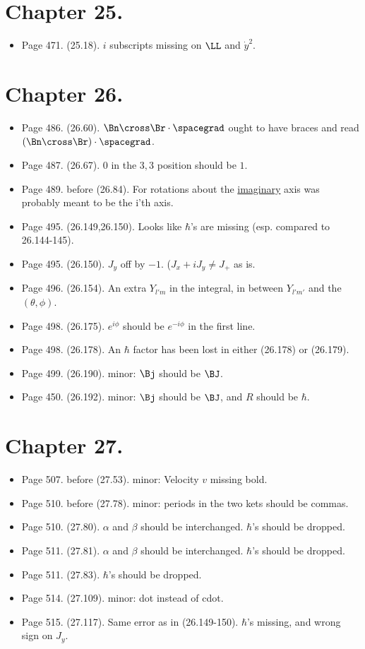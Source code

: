 \section{Chapter 25.}
\begin{itemize}
\item Page 471.  (25.18).  $i$ subscripts missing on $\LL$ and $\dot{y}^2$.
\end{itemize}

\section{Chapter 26.}
\begin{itemize}
\item Page 486.  (26.60).  $\Bn \cross \Br \cdot \spacegrad$ ought to have braces and read $(\Bn \cross \Br) \cdot \spacegrad$.
\item Page 487.  (26.67).  $0$ in the $3,3$ position should be $1$.
\item Page 489.  before (26.84).  For rotations about the \underline{imaginary} axis was probably meant to be the i'th axis.
\item Page 495.  (26.149,26.150).  Looks like $\hbar$'s are missing (esp. compared to 26.144-145).
\item Page 495.  (26.150).  $J_y$ off by $-1$. ($J_x + iJ_y \ne J_{+}$ as is.
\item Page 496.  (26.154).  An extra $Y_{l'm}$ in the integral, in between $Y_{l' m'}$ and the $(\theta, \phi)$.
\item Page 498.  (26.175).  $e^{i\phi}$ should be $e^{-i\phi}$ in the first line.
\item Page 498.  (26.178).  An $\hbar$ factor has been lost in either (26.178) or (26.179).
\item Page 499.  (26.190).  minor: $\Bj$ should be $\BJ$.
\item Page 450.  (26.192).  minor: $\Bj$ should be $\BJ$, and $R$ should be $\hbar$.
\end{itemize}

\section{Chapter 27.}
\begin{itemize}
\item Page 507.  before (27.53).  minor: Velocity $v$ missing bold.
\item Page 510.  before (27.78).  minor: periods in the two kets should be commas.
\item Page 510.  (27.80).  $\alpha$ and $\beta$ should be interchanged.  $\hbar$'s should be dropped.
\item Page 511.  (27.81).  $\alpha$ and $\beta$ should be interchanged.  $\hbar$'s should be dropped.
\item Page 511.  (27.83).  $\hbar$'s should be dropped.
\item Page 514.  (27.109).  minor: dot instead of cdot.
\item Page 515.  (27.117).  Same error as in (26.149-150).  $\hbar$'s missing, and wrong sign on $J_y$.
\end{itemize}

